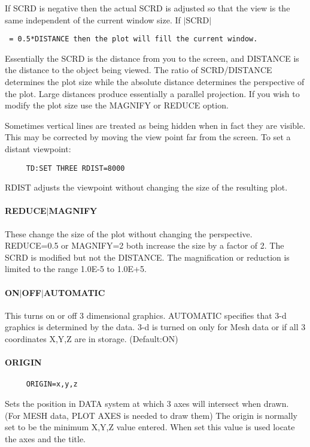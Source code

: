 If SCRD is negative then the actual SCRD is adjusted so that the view
is the same independent  of  the  current  window  size.   If  $|$SCRD$|$
\begin{verbatim}
 = 0.5*DISTANCE then the plot will fill the current window.  
\end{verbatim}

Essentially  the  SCRD  is  the  distance from you to the screen, and
DISTANCE is the distance to the object being viewed.   The  ratio  of
SCRD/DISTANCE  determines  the  plot size while the absolute distance
determines the perspective of  the  plot.   Large  distances  produce
essentially  a  parallel  projection.  If you wish to modify the plot
size use the MAGNIFY or REDUCE option.  

Sometimes  vertical  lines  are  treated as being hidden when in fact
they are visible.  This may be corrected by moving the view point far
from the screen.  To set a distant viewpoint:  
\begin{verbatim}
     TD:SET THREE RDIST=8000 
\end{verbatim}
RDIST  adjusts  the  viewpoint  without  changing  the  size  of  the
resulting plot.  
\paragraph{REDUCE$|$MAGNIFY}
These  change  the size of the plot without changing the perspective.
REDUCE=0.5 or MAGNIFY=2 both increase the size by a factor of 2.  The
SCRD  is  modified  but  not  the  DISTANCE.   The  magnification  or
reduction is limited to the range 1.0E-5 to 1.0E+5.  
\paragraph{ON$|$OFF$|$AUTOMATIC}
This  turns  on  or  off 3 dimensional graphics.  AUTOMATIC specifies
that 3-d graphics is determined by the data.  3-d is turned  on  only
for  Mesh  data  or  if  all  3  coordinates  X,Y,Z  are  in storage.
(Default:ON) 
\paragraph{ORIGIN}
\begin{verbatim}
     ORIGIN=x,y,z 
\end{verbatim}
Sets  the position in DATA system at which 3 axes will intersect when
drawn.  (For MESH data, PLOT AXES is needed to draw them) The  origin
is normally set to be the minimum X,Y,Z value entered.  When set this
value is used locate the axes and the title.  

